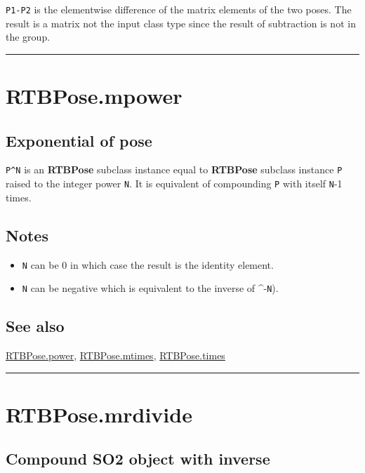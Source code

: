 \texttt{P1-P2} is the elementwise difference of the matrix elements of the two
poses.  The result is a matrix not the input class type since the result
of subtraction is not in the group.

\vspace{1.5ex}\hrule

\hypertarget{RTBPose.mpower}{\section*{RTBPose.mpower}}
\subsection*{Exponential of pose}


\texttt{P\textasciicircum N} is an \textbf{\color{red} RTBPose} subclass instance equal to \textbf{\color{red} RTBPose} subclass instance \texttt{P} raised
to the integer power \texttt{N}.  It is equivalent of compounding \texttt{P} with itself \texttt{N}-1 times.


\subsection*{Notes}
\begin{itemize}
  \item \texttt{N} can be 0 in which case the result is the identity element.
  \item \texttt{N} can be negative which is equivalent to the inverse of \textasciicircum -\texttt{N}).
\end{itemize}

\subsection*{See also}


\hyperlink{RTBPose.power}{\color{blue} RTBPose.power}, \hyperlink{RTBPose.mtimes}{\color{blue} RTBPose.mtimes}, \hyperlink{RTBPose.times}{\color{blue} RTBPose.times}

\vspace{1.5ex}\hrule

\hypertarget{RTBPose.mrdivide}{\section*{RTBPose.mrdivide}}
\subsection*{Compound SO2 object with inverse}


